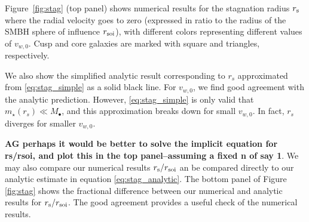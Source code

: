 \documentclass[usenatbib,fleqn]{mn2e}
\newcommand{\rs}{r_s}
\newcommand{\Mstar}{m_{\star}}
\newcommand{\Mbh}[1][]{M_{\bullet#1}}
\newcommand{\vwO}{v_{w,0}}
\begin{document}
Figure~\ref{fig:stag} (top panel) shows numerical results for the
stagnation radius $r_{\rm s}$ where the radial velocity goes to zero
(expressed in ratio to the radius of the SMBH sphere of influence
$r_{\rm soi}$), with different colors representing different values of
$v_{w,0}$.  Cusp and core galaxies are marked with square and
triangles, respectively.

We also show the simplified analytic result corresponding to $\rs$
approximated from \eqref{eq:stag_simple} as a solid black line. For
$\vwO$, we find good agreement with the analytic prediction. However,
\eqref{eq:stag_simple} is only valid that $\Mstar(\rs) \ll \Mbh$, and
this approximation breaks down for small $\vwO$. In fact, $\rs$
diverges for smaller $\vwO$. 

{\bf AG perhaps it would be better to solve the implicit equation for
  rs/rsoi, and plot this in the top panel--assuming a fixed n of say
  1}. We may also compare our numerical results $r_{\rm s}/r_{\rm
  soi}$ an be compared directly to our analytic estimate in equation
\ref{eq:stag_analytic}.  The bottom panel of Figure \ref{fig:stag}
shows the fractional difference between our numerical and analytic
results for $r_{\rm s}/r_{\rm soi}$.  The good agreement provides a
useful check of the numerical results.

\end{document}
